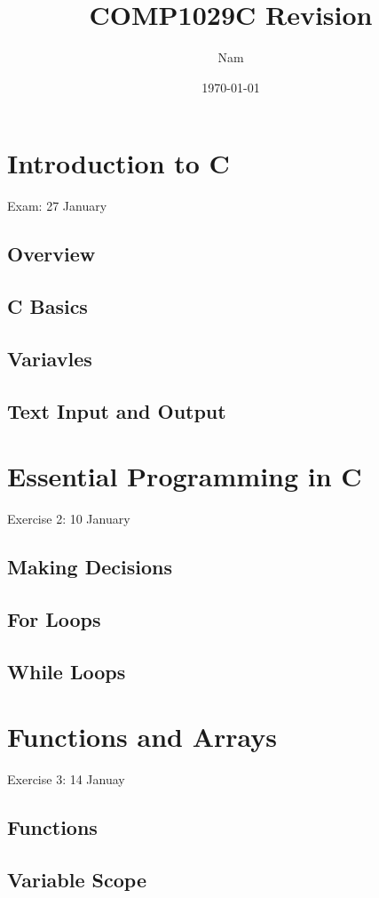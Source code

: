 \documentclass{report}
\title{COMP1029C Revision}
\author{Nam}
\date{\today}
\begin{document}
\maketitle
\tableofcontents


\chapter{Introduction to C}
Exam: 27 January 
\section{Overview} 
\section{C Basics}
\section{Variavles}
\section{Text Input and Output}


\chapter{Essential Programming in C}
Exercise 2: 10 January
\section{Making Decisions}
\section{For Loops}
\section{While Loops}



\chapter{Functions and Arrays}
Exercise 3: 14 Januay
\section{Functions}
\section{Variable Scope}
\end{document}
